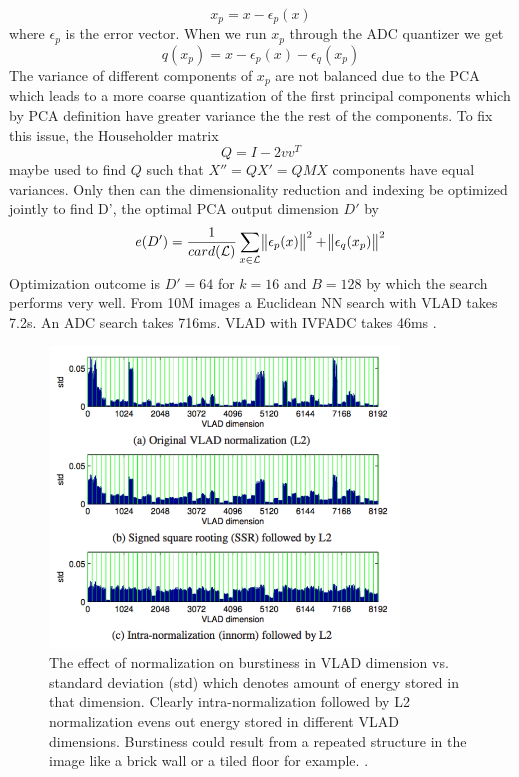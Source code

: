\documentclass[english,12pt,a4paper,pdftex,elec,utf8, table]{aaltothesis}
\begin{document}
\begin{equation}\label{vladpca}
x_p = x -\epsilon_p(x)
\end{equation}
where $\epsilon_p$ is the error vector. \cite{Jegou2014} When we run $x_p$ through the ADC quantizer we get
\begin{equation}\label{vladpcaquant}
  q(x_p) = x - \epsilon_p(x) - \epsilon_q(x_p)
\end{equation}
The variance of different components of $x_p$ are not balanced due to the PCA \cite{Jegou2014} which leads to a more coarse quantization of the first principal components which by PCA definition have greater variance the the rest of the components. To fix this issue, the Householder matrix
\begin{equation}\label{householder}
Q = I - 2vv^T
\end{equation}
maybe used to find $Q$ such that $X'' = QX' = QMX$ components have equal variances.\cite{Jegou2014} Only then can the dimensionality reduction and indexing be optimized jointly to find D', the optimal PCA output dimension $D'$ by
\begin{equation}\label{jointoptimization}
e(D') = \frac{1}{card(\mathcal{L})}\sum_{x\in \mathcal{L}}\norm{\epsilon_p(x)}^2 + \norm{\epsilon_q(x_p)}^2
\end{equation}
Optimization outcome is $D'=64$ for $k=16$ and $B=128$ by which the search performs very well. From 10M images a Euclidean NN search with VLAD takes 7.2s. An ADC search takes 716ms. VLAD with IVFADC takes 46ms \cite{Jegou2014}.

\begin{figure}[htb]
\begin{center}
\includegraphics[height=8cm]{figures/vladnorm}
\end{center}
\caption{The effect of normalization on burstiness in VLAD dimension vs. standard deviation (std) which denotes amount of energy stored in that dimension. Clearly intra-normalization followed by L2 normalization evens out energy stored in different VLAD dimensions. Burstiness could result from a repeated structure in the image like a brick wall or a tiled floor for example. \cite{Arandjelovic2013}.}
\label{vladburstiness}
\end{figure}
\end{document}
